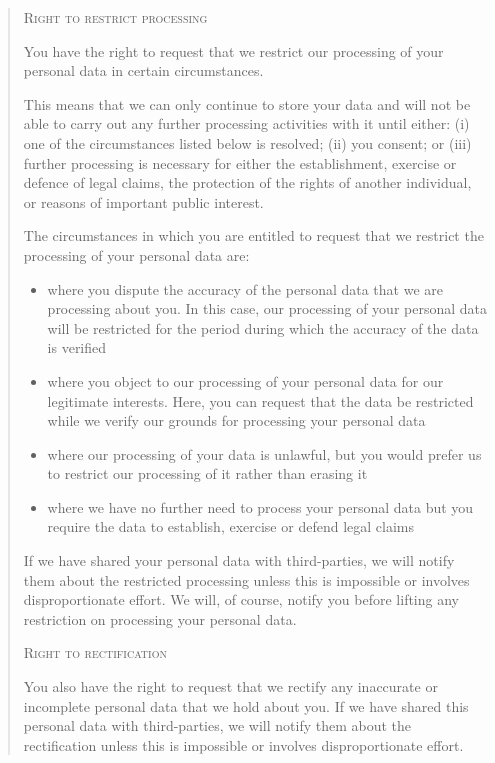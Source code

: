 \documentclass[twocolumn, letterpaper,13pt]{scrartcl}
\begin{document}
\begin{quote}
        \textsc{Right to restrict processing}
        
        You have the right to request that we restrict our processing of your personal data in certain circumstances.
        
        This means that we can only continue to store your data and will not be able to carry out any further processing activities with it until either: (i) one of the circumstances listed below is resolved; (ii) you consent; or (iii) further processing is necessary for either the establishment, exercise or defence of legal claims, the protection of the rights of another individual, or reasons of important public interest.
        
        The circumstances in which you are entitled to request that we restrict the processing of your personal data are:
        
        \begin{itemize}
            \item where you dispute the accuracy of the personal data that we are processing about you. In this case, our processing of your personal data will be restricted for the period during which the accuracy of the data is verified
            \item where you object to our processing of your personal data for our legitimate interests. Here, you can request that the data be restricted while we verify our grounds for processing your personal data
            \item where our processing of your data is unlawful, but you would prefer us to restrict our processing of it rather than erasing it
            \item where we have no further need to process your personal data but you require the data to establish, exercise or defend legal claims
        \end{itemize}
        If we have shared your personal data with third-parties, we will notify them about the restricted processing unless this is impossible or involves disproportionate effort. We will, of course, notify you before lifting any restriction on processing your personal data.
        
        \textsc{Right to rectification}
        
        You also have the right to request that we rectify any inaccurate or incomplete personal data that we hold about you. If we have shared this personal data with third-parties, we will notify them about the rectification unless this is impossible or involves disproportionate effort.
        

\end{quote}
\end{document}
